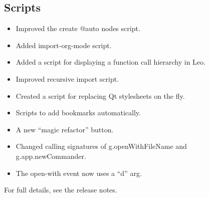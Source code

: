 \documentclass[a4paper,10pt,english]{sphinxmanual}
\begin{document}
\subsection{Scripts}
\label{what-is-new:scripts}\begin{itemize}
\item {} 
Improved the create @auto nodes script.

\item {} 
Added import-org-mode script.

\item {} 
Added a script for displaying a function call hierarchy in Leo.

\item {} 
Improved recursive import script.

\item {} 
Created a script for replacing Qt stylesheets on the fly.

\item {} 
Scripts to add bookmarks automatically.

\item {} 
A new ``magic refactor'' button.

\item {} 
Changed calling signatures of g.openWithFileName and g.app.newCommander.

\item {} 
The open-with event now uses a ``d'' arg.

\end{itemize}

For full details, see the release notes.
\end{document}
